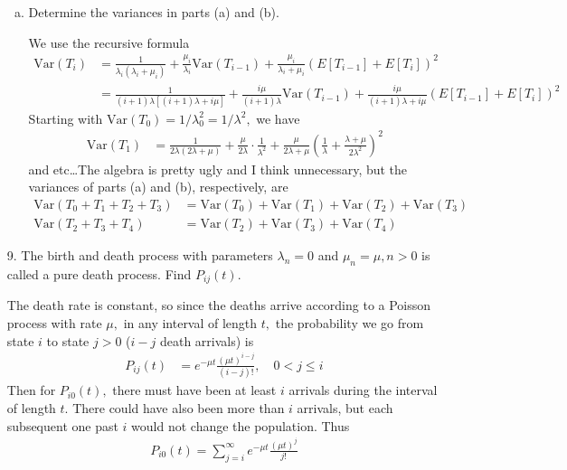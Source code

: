 \documentclass{article}
\newcommand{\var}{\mathrm{Var}}
\begin{document}
\begin{itemize}
\begin{enumerate}[(a)]
			\item Determine the variances in parts (a) and (b).
				\begin{soln}
					We use the recursive formula
					\begin{align*}
						\var(T_i) &= \frac{1}{\lambda_i(\lambda_i+\mu_i)} + \frac{\mu_i}{\lambda_i}\var(T_{i-1}) + \frac{\mu_i}{\lambda_i+\mu_i}\left( E[T_{i-1}] + E[T_i] \right)^2 \\
						&= \frac{1}{(i+1)\lambda\left[ (i+1)\lambda+i\mu \right]} + \frac{i\mu}{(i+1)\lambda} \var(T_{i-1}) + \frac{i\mu}{(i+1)\lambda+i\mu}\left( E[T_{i-1}] + E[T_i] \right)^2
					\end{align*}
					Starting with $\var(T_0) = 1/\lambda_0^2 = 1/\lambda^2,$ we have
					\begin{align*}
						\var(T_1) &= \frac{1}{2\lambda(2\lambda+\mu)} + \frac{\mu}{2\lambda}\cdot \frac{1}{\lambda^2} + \frac{\mu}{2\lambda+\mu} \left( \frac{1}{\lambda} + \frac{\lambda+\mu}{2\lambda^2} \right)^2
					\end{align*}
					and etc\ldots The algebra is pretty ugly and I think unnecessary, but the variances of parts (a) and (b), respectively, are
					\begin{align*}
						\var(T_0+T_1+T_2+T_3) &= \var(T_0) + \var(T_1) + \var(T_2) + \var(T_3) \\
						\var(T_2+T_3+T_4) &= \var(T_2) + \var(T_3) + \var(T_4)
					\end{align*}
				\end{soln}

		\end{enumerate}

	\item[9.] The birth and death process with parameters $\lambda_n=0$ and $\mu_n=\mu, n>0$ is called a pure death process. Find $P_{ij}(t).$
		\begin{soln}
			The death rate is constant, so since the deaths arrive according to a Poisson process with rate $\mu,$ in any interval of length $t,$ the probability we go from state $i$ to state $j>0$ ($i-j$ death arrivals) is
			\begin{align*}
				P_{ij}(t) &= e^{-\mu t} \frac{(\mu t)^{i-j}}{(i-j)!}, \quad 0<j\le i
			\end{align*}
			Then for $P_{i0}(t),$ there must have been at least $i$ arrivals during the interval of length $t.$ There could have also been more than $i$ arrivals, but each subsequent one past $i$ would not change the population. Thus
			\begin{align*}
				P_{i0}(t) = \sum_{j=i}^{\infty} e^{-\mu t} \frac{(\mu t)^j}{j!}
			\end{align*}
		\end{soln}

\end{itemize}
\end{document}
